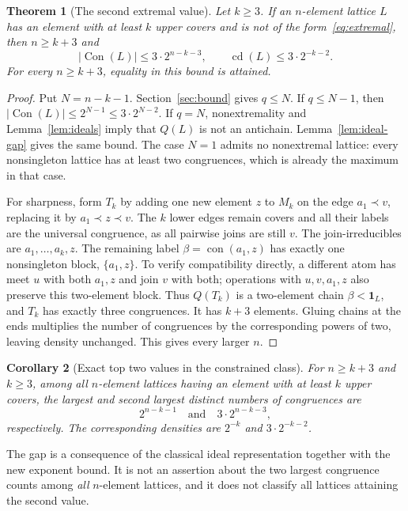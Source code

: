 \documentclass[11pt,a4paper]{article}
\numberwithin{equation}{section}
\newtheorem{theorem}{Theorem}[section]
\newtheorem{corollary}[theorem]{Corollary}
\theoremstyle{definition}
\theoremstyle{remark}
\DeclareMathOperator{\Con}{Con}
\DeclareMathOperator{\con}{con}
\DeclareMathOperator{\cdens}{cd}
\newcommand{\allcon}{\mathbf 1_L}
\newcommand{\card}[1]{\lvert #1\rvert}
\begin{document}
\begin{theorem}[The second extremal value]\label{thm:gap}
Let $k\ge3$. If an $n$-element lattice $L$ has an element with at least $k$ upper
covers and is not of the form~\eqref{eq:extremal}, then $n\ge k+3$ and
\begin{equation}\label{eq:gap}
 \card{\Con(L)}\le3\cdot2^{n-k-3},\qquad
 \cdens(L)\le3\cdot2^{-k-2}.
\end{equation}
For every $n\ge k+3$, equality in this bound is attained.
\end{theorem}
\begin{proof}
Put $N=n-k-1$. Section~\ref{sec:bound} gives $q\le N$.
If $q\le N-1$, then $\card{\Con(L)}\le2^{N-1}\le3\cdot2^{N-2}$.
If $q=N$, nonextremality and Lemma~\ref{lem:ideals} imply that $Q(L)$ is not an
antichain. Lemma~\ref{lem:ideal-gap} gives the same bound.
The case $N=1$ admits no nonextremal lattice: every nonsingleton lattice has at
least two congruences, which is already the maximum in that case.

For sharpness, form $T_k$ by adding one new element $z$ to $M_k$ on the edge
$a_1\prec v$, replacing it by $a_1\prec z\prec v$.
The $k$ lower edges remain covers and all their labels are the universal
congruence, as all pairwise joins are still $v$.
The join-irreducibles are $a_1,\ldots,a_k,z$.
The remaining label $\beta=\con(a_1,z)$ has exactly one nonsingleton block,
$\{a_1,z\}$. To verify compatibility directly, a different atom has meet $u$
with both $a_1,z$ and join $v$ with both; operations with $u,v,a_1,z$ also
preserve this two-element block. Thus $Q(T_k)$ is a two-element chain
$\beta<\allcon$, and $T_k$ has exactly three congruences.
It has $k+3$ elements. Gluing chains at the ends multiplies the number of
congruences by the corresponding powers of two, leaving density unchanged.
This gives every larger $n$.
\end{proof}

\begin{corollary}[Exact top two values in the constrained class]
For $n\ge k+3$ and $k\ge3$, among all $n$-element lattices having an element with
at least $k$ upper covers, the largest and second largest distinct numbers of
congruences are
\[
 2^{n-k-1}\quad\text{and}\quad3\cdot2^{n-k-3},
\]
respectively. The corresponding densities are $2^{-k}$ and $3\cdot2^{-k-2}$.
\end{corollary}

The gap is a consequence of the classical ideal representation together with
the new exponent bound. It is not an assertion about the two largest
congruence counts among \emph{all} $n$-element lattices, and it does not classify
all lattices attaining the second value.
\end{document}
